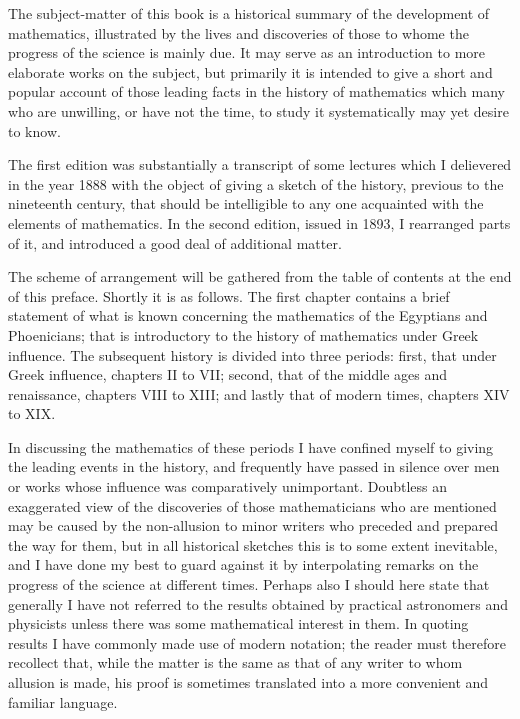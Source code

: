 \documentclass[12pt,oneside]{book}
\begin{document}
The subject-matter of this book is a historical summary of the development of mathematics, illustrated by the lives and discoveries of those to
whome the progress of the science is mainly due. It may serve as an introduction to more elaborate works on the subject, but primarily it is intended
to give a short and popular account of those leading facts in the history of mathematics which many who are unwilling, or have not the time, to study
it systematically may yet desire to know. 

The first edition was substantially a transcript of some lectures which I delievered in the year 1888 with the object of giving a sketch of the history,
previous to the nineteenth century, that should be intelligible to any one acquainted with the elements of mathematics. In the second edition, issued in 
1893, I rearranged parts of it, and introduced a good deal of additional matter. \par 

The scheme of arrangement will be gathered from the table of contents at the end of this preface. Shortly it is as follows. The first chapter contains
a brief statement of what is known concerning the mathematics of the Egyptians and Phoenicians; that is introductory to the history of mathematics
under Greek influence. The subsequent history is divided into three periods: first, that under Greek influence, chapters II to VII; second, that of 
the middle ages and renaissance, chapters VIII to XIII; and lastly that of modern times, chapters XIV to XIX. \par 

In discussing the mathematics of these periods I have confined myself to giving the leading events in the history, and frequently have passed in silence 
over men or works whose influence was comparatively unimportant. Doubtless an exaggerated view of the discoveries of those mathematicians who are mentioned 
may be caused by the non-allusion to minor writers who preceded and prepared the way for them, but in all historical sketches this is to some extent inevitable,
and I have done my best to guard against it by interpolating remarks on the progress of the science at different times. Perhaps also I should here state that
generally I have not referred to the results obtained by practical astronomers and physicists unless there was some mathematical interest in them.
In quoting results I have commonly made use of modern notation; the reader must therefore recollect that, while the matter is the same as that of any writer
to whom allusion is made, his proof is sometimes translated into a more convenient and familiar language. \par 
\end{document}
